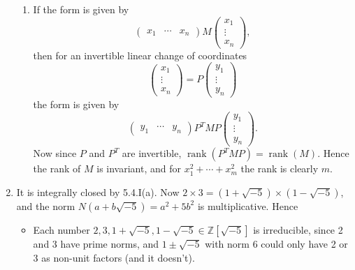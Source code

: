 \documentclass{report}
\newcommand{\Z}{\mathbb{Z}}
\DeclareMathOperator{\rank}{rank}
\begin{document}
\begin{enumerate}[label=\textbf{5.4.\Alph*.}]
\begin{enumerate}[label=(\alph*)]
		      \item If the form is given by
		            \begin{equation*}
			            \begin{pmatrix}
				            x_1 & \cdots & x_n
			            \end{pmatrix}
			            M
			            \begin{pmatrix}
				            x_1 \\ \vdots \\ x_n
			            \end{pmatrix},
		            \end{equation*}
		            then for an invertible linear change of coordinates
		            \begin{equation*}
			            \begin{pmatrix}
				            x_1 \\ \vdots \\ x_n
			            \end{pmatrix}
			            = P
			            \begin{pmatrix}
				            y_1 \\ \vdots \\ y_n
			            \end{pmatrix}
		            \end{equation*}
		            the form is given by
		            \begin{equation*}
			            \begin{pmatrix}
				            y_1 & \cdots & y_n
			            \end{pmatrix}
			            P^TMP
			            \begin{pmatrix}
				            y_1 \\ \vdots \\ y_n
			            \end{pmatrix}.
		            \end{equation*}
		            Now since $P$ and $P^T$ are invertible, $\rank(P^TMP)=\rank(M)$.
		            Hence the rank of $M$ is invariant, and for $x_1^2+\cdots+x_m^2$
		            the rank is clearly $m$.
	      \end{enumerate}

	\item It is integrally closed by 5.4.I(a). Now
	      $2\times3=(1+\sqrt{-5})\times(1-\sqrt{-5})$, and the norm
	      $N(a+b\sqrt{-5})=a^2+5b^2$ is multiplicative. Hence
	      \begin{itemize}
		      \item Each number $2,3,1+\sqrt{-5},1-\sqrt{-5}\in\Z[\sqrt{-5}]$ is
		            irreducible, since 2 and 3 have prime norms, and
		            $1\pm\sqrt{-5}$ with norm 6 could only have 2 or 3 as non-unit
		            factors (and it doesn't).


\end{itemize}
\end{enumerate}
\end{document}
